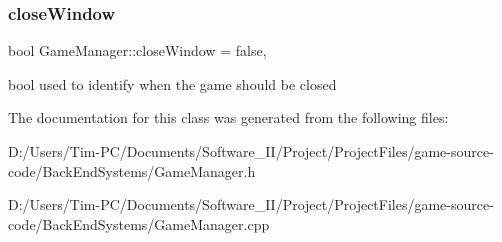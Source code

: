 \subsubsection{\texorpdfstring{close\+Window}{closeWindow}}
{\footnotesize\ttfamily bool Game\+Manager\+::close\+Window = false\hspace{0.3cm}{\ttfamily [static]}, {\ttfamily [private]}}

bool used to identify when the game should be closed 

The documentation for this class was generated from the following files\+:\begin{DoxyCompactItemize}
\item 
D\+:/\+Users/\+Tim-\/\+P\+C/\+Documents/\+Software\+\_\+\+I\+I/\+Project/\+Project\+Files/game-\/source-\/code/\+Back\+End\+Systems/Game\+Manager.\+h\item 
D\+:/\+Users/\+Tim-\/\+P\+C/\+Documents/\+Software\+\_\+\+I\+I/\+Project/\+Project\+Files/game-\/source-\/code/\+Back\+End\+Systems/Game\+Manager.\+cpp\end{DoxyCompactItemize}

